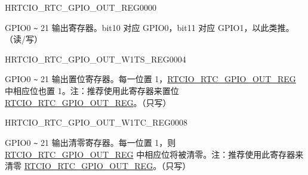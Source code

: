 ﻿\begin{register}{H}{RTCIO\_RTC\_GPIO\_OUT\_REG}{\hexprefix{}0000}\label{regdesc:RTCIORTCGPIOOUTREG}
%
%
\regnewline%
\begin{regdesc}\begin{reglist}
\label{fielddesc:RTCIOGPIOOUTDATA}\item [RTCIO\_GPIO\_OUT\_DATA] GPIO0 \verb+~+ 21 输出寄存器。bit10 对应 GPIO0，bit11 对应 GPIO1，以此类推。（读/写）
\end{reglist}\end{regdesc}
\end{register}


\begin{register}{H}{RTCIO\_RTC\_GPIO\_OUT\_W1TS\_REG}{\hexprefix{}0004}\label{regdesc:RTCIORTCGPIOOUTW1TSREG}
%
%
\regnewline%
\begin{regdesc}\begin{reglist}
\label{fielddesc:RTCIOGPIOOUTDATAW1TS}\item [RTCIO\_GPIO\_OUT\_DATA\_W1TS] GPIO0 \verb+~+ 21 输出置位寄存器。每一位置 1，\hyperref[regdesc:RTCIORTCGPIOOUTREG]{RTCIO\_RTC\_GPIO\_OUT\_REG} 中相应位也置 1。注：推荐使用此寄存器来置位 \hyperref[regdesc:RTCIORTCGPIOOUTREG]{RTCIO\_RTC\_GPIO\_OUT\_REG}。（只写）
\end{reglist}\end{regdesc}
\end{register}


\begin{register}{H}{RTCIO\_RTC\_GPIO\_OUT\_W1TC\_REG}{\hexprefix{}0008}\label{regdesc:RTCIORTCGPIOOUTW1TCREG}
%
%
\regnewline%
\begin{regdesc}\begin{reglist}
\label{fielddesc:RTCIOGPIOOUTDATAW1TC}\item [RTCIO\_GPIO\_OUT\_DATA\_W1TC] GPIO0 \verb+~+ 21 输出清零寄存器。每一位置 1，则 \hyperref[regdesc:RTCIORTCGPIOOUTREG]{RTCIO\_RTC\_GPIO\_OUT\_REG} 中相应位将被清零。注：推荐使用此寄存器来清零 \hyperref[regdesc:RTCIORTCGPIOOUTREG]{RTCIO\_RTC\_GPIO\_OUT\_REG}。（只写）
\end{reglist}\end{regdesc}
\end{register}


